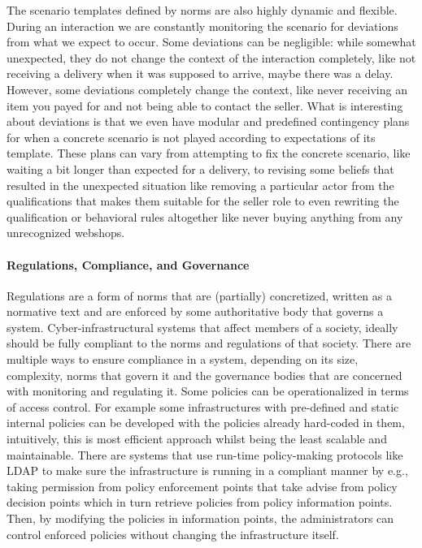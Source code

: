 The scenario templates defined by norms are also highly dynamic and flexible. During an interaction we are constantly monitoring the scenario for deviations from what we expect to occur. Some deviations can be negligible: while somewhat unexpected, they do not change the context of the interaction completely, like not receiving a delivery when it was supposed to arrive, maybe there was a delay. However, some deviations completely change the context, like never receiving an item you payed for and not being able to contact the seller. What is interesting about deviations is that we even have modular and predefined contingency plans for when a concrete scenario is not played according to expectations of its template. These plans can vary from attempting to fix the concrete scenario, like waiting a bit longer than expected for a delivery, to revising some beliefs that resulted in the unexpected situation like removing a particular actor from the qualifications that makes them suitable for the seller role to even rewriting the qualification or behavioral rules altogether like never buying anything from any unrecognized webshops.

\paragraph{Regulations, Compliance, and Governance}
Regulations are a form of norms that are (partially) concretized, written as a normative text and are enforced by some authoritative body that governs a system.  Cyber-infrastructural systems that affect members of a society, ideally should be fully compliant to the norms and regulations of that society. There are multiple ways to ensure compliance in a system, depending on its size, complexity, norms that govern it and the governance bodies that are concerned with monitoring and regulating it. Some policies can be operationalized in terms of access control. For example some infrastructures with pre-defined and static internal policies can be developed with the policies already hard-coded in them, intuitively, this is most efficient approach whilst being the least scalable and maintainable. There are systems that use run-time policy-making protocols like LDAP to make sure the infrastructure is running in a compliant manner by e.g., taking permission from policy enforcement points that take advise from policy decision points which in turn retrieve policies from policy information points. Then, by modifying the policies in information points, the administrators can control enforced policies without changing the infrastructure itself. 

